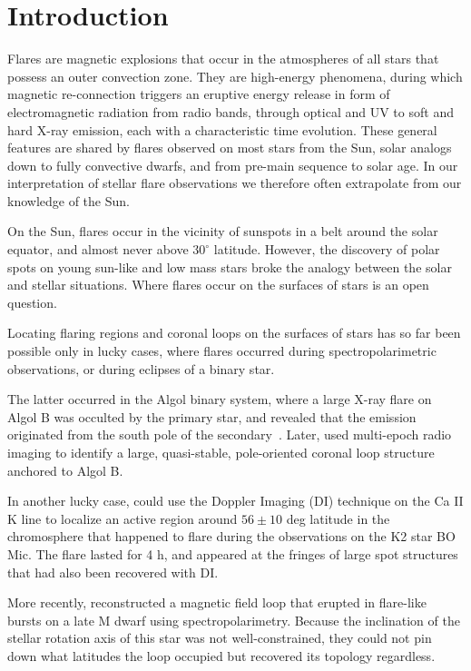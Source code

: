\documentclass[proof]{WileyASNA-v1}
\begin{document}


\section{Introduction}\label{sec:intro}

Flares are magnetic explosions that occur in the atmospheres of all stars that possess an outer convection zone. They are high-energy phenomena, during which magnetic re-connection triggers an eruptive energy release in form of electromagnetic radiation from radio bands, through optical and UV to soft and hard X-ray emission, each with a characteristic time evolution. These general features are shared by flares observed on most stars from the Sun, solar analogs down to fully convective dwarfs, and from pre-main sequence to solar age. In our interpretation of stellar flare observations we therefore often extrapolate from our knowledge of the Sun.

On the Sun, flares occur in the vicinity of sunspots in a belt around the solar equator, and almost never above $30^\circ$ latitude. However, the discovery of polar spots on young sun-like and low mass stars broke the analogy between the solar and stellar situations. Where flares occur on the surfaces of stars is an open question. 

Locating flaring regions and coronal loops on the surfaces of stars has so far been possible only in lucky cases, where flares occurred during spectropolarimetric observations, or during eclipses of a binary star. 

The latter occurred in the Algol binary system, where a large X-ray flare on Algol B was occulted by the primary star, and revealed that the emission originated from the south pole of the secondary~\citep{schmitt1999}. Later, \citet{peterson2010} used multi-epoch radio imaging to identify a large, quasi-stable, pole-oriented coronal loop structure anchored to Algol B. 

In another lucky case, \citet{wolter2008} could use the Doppler Imaging (DI) technique on the Ca II K line to localize an active region around $56\pm10$ deg latitude in the chromosphere that happened to flare during the observations on the K2 star BO Mic. The flare lasted for 4 h, and appeared at the fringes of large spot structures that had also been recovered with DI.

More recently, \citet{berdyugina2017} reconstructed a magnetic field loop that erupted in flare-like bursts on a late M dwarf using spectropolarimetry. Because the inclination of the stellar rotation axis of this star was not well-constrained, they could not pin down what latitudes the loop occupied but recovered its topology regardless.
\end{document}
